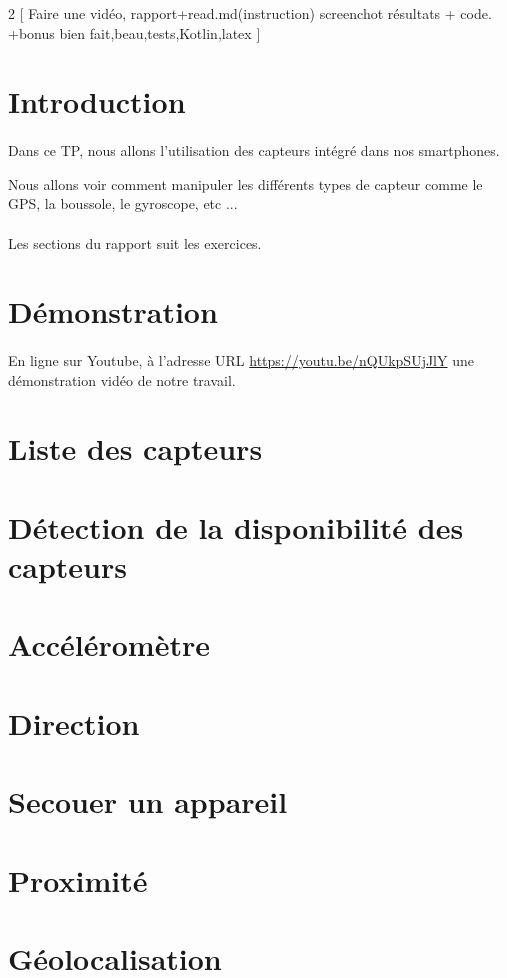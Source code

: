 \documentclass[a4paper]{article}
\begin{document}
    \newpage
    \begin{multicols}{2}
        [
            Faire une vidéo, rapport+read.md(instruction) screenchot résultats + code. +bonus bien fait,beau,tests,Kotlin,latex
        ]
        \section*{Introduction}
        \paragraph{}
            Dans ce TP, nous allons l'utilisation des capteurs intégré dans nos smartphones.
            
            Nous allons voir comment manipuler les différents types de capteur comme le GPS, la boussole, le gyroscope, etc ...
        \paragraph{}
            Les sections du rapport suit les exercices.
        \section*{Démonstration}
            \paragraph{}
            En ligne sur Youtube, à l'adresse URL \url{https://youtu.be/nQUkpSUjJlY} une démonstration vidéo de notre travail.
        \section{Liste des capteurs}
        \section{Détection de la disponibilité des capteurs}  
        \section{Accéléromètre}
        \section{Direction}
        \section{Secouer un appareil}
        \section{Proximité}
        \section{Géolocalisation}
    \end{multicols}
\end{document}
